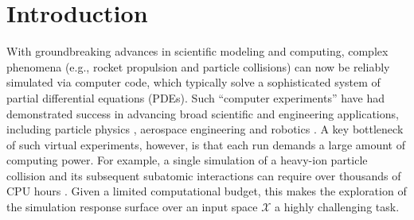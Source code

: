 \documentclass[aos,preprint]{imsart}
\theoremstyle{plain}
\theoremstyle{remark}
\begin{document}
\begin{frontmatter}
\begin{abstract}
\end{abstract}

\begin{keyword}[class=MSC]
\end{keyword}

\begin{keyword}
\end{keyword}

\end{frontmatter}

\section{Introduction}

With groundbreaking advances in scientific modeling and computing, complex phenomena (e.g., rocket propulsion and particle collisions) can now be reliably simulated via computer code, which typically solve a sophisticated system of partial differential equations (PDEs). Such ``computer experiments'' have had demonstrated success in advancing broad scientific and engineering applications, including particle physics \citep{sengupta2025hybrid,liyanage2022efficient}, aerospace engineering \citep{mak2018efficient,miller2024expected} and robotics \citep{choi2021use,liu2025quip}. A key bottleneck of such virtual experiments, however, is that each run demands a large amount of computing power. For example, a single simulation of a heavy-ion particle collision and its subsequent subatomic interactions can require over thousands of CPU hours \citep{ji2024conglomerate}. Given a limited computational budget, this makes the exploration of the simulation response surface over an input space $\mathcal{X}$ a highly challenging task.
\end{document}
